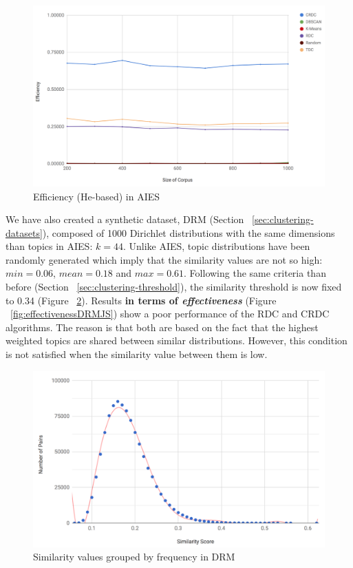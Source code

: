 \begin{figure}[!htb]\centering
  \center
  \includegraphics[scale=0.45]{efficiencyHe.png}
  \caption{Efficiency (He-based) in AIES}
  \label{fig:efficiencyHe}
\end{figure}

We have also created a synthetic dataset, DRM (Section ~\ref{sec:clustering-datasets}), composed of 1000 Dirichlet distributions with the same dimensions than topics in AIES: $k=44$. Unlike AIES, topic distributions have been randomly generated which imply that the similarity values are not so high: $min=0.06$, $mean=0.18$ and $max=0.61$. Following the same criteria than before (Section ~\ref{sec:clustering-threshold}), the similarity threshold is now fixed to 0.34 (Figure ~\ref{fig:similaritiesDRM}). Results \textbf{in terms of \textit{effectiveness}} (Figure ~\ref{fig:effectivenessDRMJS}) show a poor performance of the RDC and CRDC algorithms. The reason is that both are based on the fact that the highest weighted topics are shared between similar distributions. However, this condition is not satisfied when the similarity value between them is low.


\begin{figure}[!htb]\centering
  \includegraphics[scale=0.50]{similaritiesDRM.png}
  \caption{Similarity values grouped by frequency in DRM}
  \label{fig:similaritiesDRM}
\end{figure}


